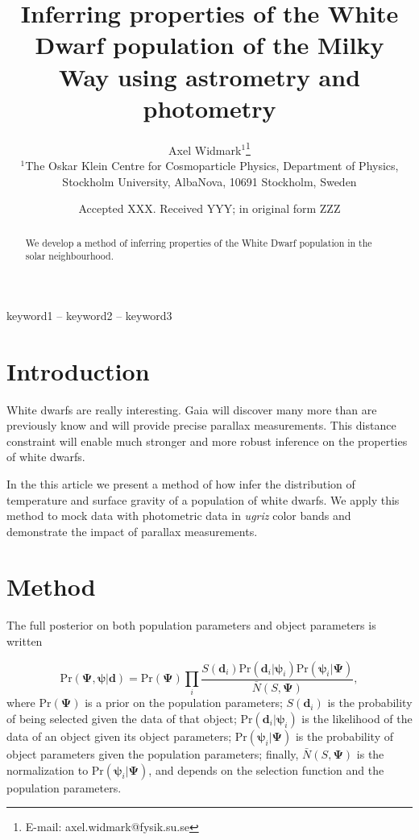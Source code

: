 \documentclass[fleqn,usenatbib]{mnras}
\title[Inferring properties of the White Dwarf population]{Inferring properties of the White Dwarf population of the Milky Way using astrometry and photometry}
\author[A. Widmark]{
Axel Widmark$^1$\thanks{E-mail: axel.widmark@fysik.su.se} 
\\
$^1$The Oskar Klein Centre for Cosmoparticle Physics, Department of
Physics, Stockholm University, AlbaNova, 10691 Stockholm, Sweden\\
}
\date{Accepted XXX. Received YYY; in original form ZZZ}
\newcommand{\popp}{\boldsymbol{\Psi}}
\newcommand{\objp}{\boldsymbol{\psi}}
\newcommand{\data}{\mathbf{d}}
\newcommand{\pr}{\text{Pr}}
\begin{document}
\label{firstpage}
\pagerange{\pageref{firstpage}--\pageref{lastpage}}
\maketitle

\begin{abstract}
We develop a method of inferring properties of the White Dwarf population in the solar neighbourhood.
\end{abstract}

\begin{keywords}
keyword1 -- keyword2 -- keyword3
\end{keywords}



\section{Introduction}

White dwarfs are really interesting. Gaia will discover many more than are previously know and will provide precise parallax measurements. This distance constraint will enable much stronger and more robust inference on the properties of white dwarfs.

In the this article we present a method of how infer the distribution of temperature and surface gravity of a population of white dwarfs. We apply this method to mock data with photometric data in \emph{ugriz} color bands and demonstrate the impact of parallax measurements.


\section{Method}\label{sec:method}

The full posterior on both population parameters and object parameters is written

\begin{equation}
	\pr(\popp,\objp | \data ) = \pr(\popp)
    \prod_i \frac{S(\data_i) \pr(\data_i|\objp_i) \pr(\objp_i | \popp)}{\bar{N}(S,\popp)},
\end{equation}
where $\pr(\popp)$ is a prior on the population parameters; $S(\data_i)$ is the probability of being selected given the data of that object; $\pr(\data_i|\objp_i)$ is the likelihood of the data of an object given its object parameters; $\pr(\objp_i | \popp)$ is the probability of object parameters given the population parameters; finally, $\bar{N}(S,\popp)$ is the normalization to $\pr(\objp_i | \popp)$, and depends on the selection function and the population parameters.
\end{document}
